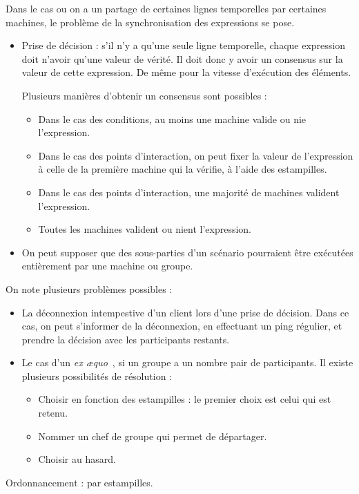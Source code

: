 \documentclass{article}
\begin{document}
Dans le cas ou on a un partage de certaines lignes temporelles par certaines machines, le problème de la synchronisation des expressions se pose.

\begin{itemize}
	\item Prise de décision : s'il n'y a qu'une seule ligne temporelle, chaque expression doit n'avoir qu'une valeur de vérité. Il doit donc y avoir un consensus sur la valeur de cette expression. De même pour la vitesse d'exécution des éléments.
    
    Plusieurs manières d'obtenir un consensus sont possibles : 
    \begin{itemize}
        \item Dans le cas des conditions, au moins une machine valide ou nie l'expression. 
        \item Dans le cas des points d'interaction, on peut fixer la valeur de l'expression à celle de la première machine qui la vérifie, à l'aide des estampilles. %
        \item Dans le cas des points d'interaction, une majorité de machines valident l'expression.
        \item Toutes les machines valident ou nient l'expression.
    \end{itemize}

	\item On peut supposer que des sous-parties d'un scénario pourraient être exécutées entièrement par une machine ou groupe.
\end{itemize}

On note plusieurs problèmes possibles : 
\begin{itemize}
    \item La déconnexion intempestive d'un client lors d'une prise de décision. 
    Dans ce cas, on peut s'informer de la déconnexion, en effectuant un ping régulier, et prendre la décision avec les participants restants. 
    \item Le cas d'un \textit{ex æquo}~, si un groupe a un nombre pair de participants.
    Il existe plusieurs possibilités de résolution : 
    \begin{itemize}
        \item Choisir en fonction des estampilles : le premier choix est celui qui est retenu.
        \item Nommer un chef de groupe qui permet de départager.
        \item Choisir au hasard.
    \end{itemize}
\end{itemize}
Ordonnancement : par estampilles.
\end{document}
